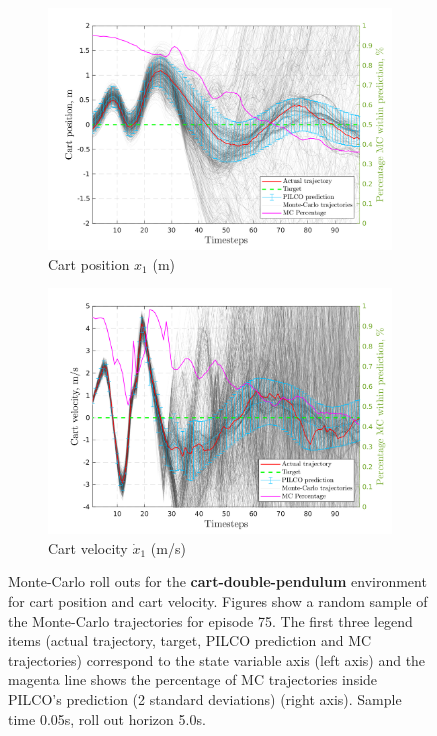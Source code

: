  \begin{figure}[H]    
    \begin{subfigure}[b]{1\linewidth}
    \centering
    \includegraphics[height=0.4\textheight,width=1\textwidth]{Chapter3/Figures/cdp_MC_rollout_Ep_80_Dim_1.png} 
    \caption{Cart position $x_1$ (m)} 
    \label{Fig:Re-cdp-cart-position} 
  \end{subfigure} 

  \begin{subfigure}[b]{1\linewidth}
    \centering
    \includegraphics[height=0.4\textheight,width=1\textwidth]{Chapter3/Figures/cdp_MC_rollout_Ep_80_Dim_2.png} 
    \caption{Cart velocity $\dot{x}_1$ (m/s)} 
    \label{Fig:Re-cdp-cart-velocity} 
  \end{subfigure} 
\caption[Monte-Carlo roll outs for \textbf{cart-double-pendulum} cart position and cart velocity]{Monte-Carlo roll outs for the \textbf{cart-double-pendulum} environment for cart position and cart velocity. Figures show a random sample of the Monte-Carlo trajectories for episode 75. The first three legend items (actual trajectory, target, PILCO prediction and MC trajectories) correspond to the state variable axis (left axis) and the magenta line shows the percentage of MC trajectories inside PILCO's prediction (2 standard deviations) (right axis). Sample time 0.05s, roll out horizon 5.0s.}
\label{Fig:Re-cdp-MC-roll-outs-1} 
\end{figure}
 

